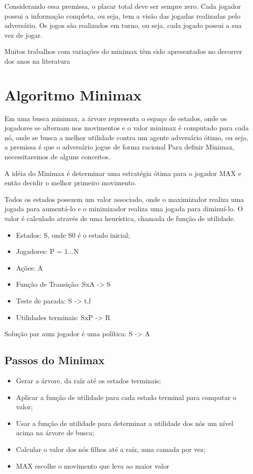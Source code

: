 \documentclass[sigplan,screen]{acmart}
\begin{document}
Considerando essa premissa, o placar total deve ser sempre zero.
Cada jogador possui a informação completa, ou seja, tem a visão das jogadas realizadas pelo adversário. Os jogos são realizados em turno, ou seja, cada jogado possui a sua vez de jogar.

Muitos trabalhos com variações do minimax têm sido apresentados no decorrer dos anos na literatura \cite{Diderich93}

\section{Algoritmo Minimax}
Em uma busca minimax, a árvore representa o espaço de estados, onde os jogadores se alternam nos movimentos e o valor minimax é computado para cada nó, onde se busca a melhor utilidade contra um agente adversário ótimo, ou seja, a premissa é que o adversário jogue de forma racional
Para definir Minimax, necessitaremos de alguns conceitos.

A idéia do Minimax é determinar uma estratégia ótima para o jogador MAX e então decidir o melhor primeiro movimento.

Todos os estados possuem um valor associado, onde o maximizador realiza uma jogada para aumentá-lo e o minimizador realiza uma jogada para diminuí-lo. 
O valor é calculado através de uma heurística, chamada de função de utilidade.

\begin{itemize}
  \item{Estados: S, onde S0 é o estado inicial;}
  \item{Jogadores: P = {1...N}}
  \item{Ações: A}
  \item{Função de Transição: SxA -> S}
  \item{Teste de parada: S -> {t,f}}
  \item{Utilidades terminais: SxP -> R}
\end{itemize}

Solução par aum jogador é uma política: S -> A

\subsection{Passos do Minimax}

\begin{itemize}
  \item Gerar a árvore, da raíz até os estados terminais;
  \item Aplicar a função de utilidade para cada estado terminal para computar o valor;
  \item Usar a função de utilidade para determinar a utilidade dos nós um nível acima na árvore de busca;
  \item Calcular o valor dos nós filhos até a raíz, uma camada por vez;
  \item MAX escolhe o movimento que leva ao maior valor 
\end{itemize}
\end{document}
